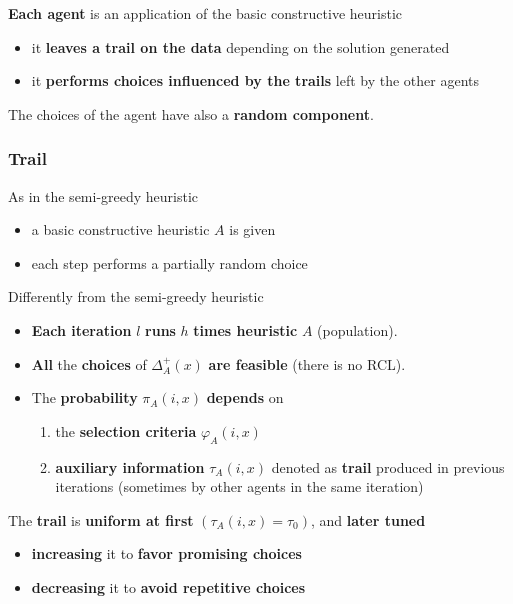 \textbf{Each agent} is an application of the basic constructive heuristic
\begin{itemize}
	\item it \textbf{leaves a trail on the data} depending on the solution generated
	
	\item it \textbf{performs choices influenced by the trails} left by the other agents
\end{itemize}

The choices of the agent have also a \textbf{random component}.\\

\newpage

\subsubsection{Trail}
As in the semi-greedy heuristic
\begin{itemize}
	\item a basic constructive heuristic $A$ is given
	\item each step performs a partially random choice
\end{itemize}

Differently from the semi-greedy heuristic
\begin{itemize}
	\item \textbf{Each iteration} $l$ \textbf{runs} $h$ \textbf{times heuristic} $A$ (population).\\
	
	\item \textbf{All} the \textbf{choices} of $\Delta_A^+ (x)$ \textbf{are feasible} (there is no RCL).\\
	
	\item The \textbf{probability} $\pi_A (i, x)$ \textbf{depends} on
	\begin{enumerate}
		\item the \textbf{selection criteria} $\varphi_A (i, x)$
		
		\item \textbf{auxiliary information} $\tau_A (i, x)$ denoted as \textbf{trail} produced in previous iterations (sometimes by other agents in the same iteration)
	\end{enumerate}
	\nn
\end{itemize}

The \textbf{trail} is \textbf{uniform at first} $(\tau_A (i, x) = \tau_0)$, and \textbf{later tuned}
\begin{itemize}
	\item \textbf{increasing} it to \textbf{favor promising choices}
	\item \textbf{decreasing} it to \textbf{avoid repetitive choices}
\end{itemize}

